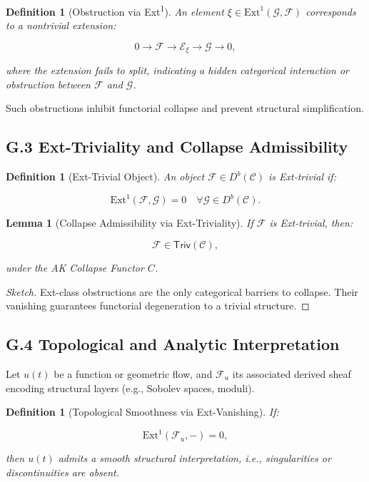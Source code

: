 \documentclass[11pt]{article}
\newtheorem{definition}[theorem]{Definition}
\newtheorem{lemma}[theorem]{Lemma}
\begin{document}
\begin{definition}[Obstruction via Ext\textsuperscript{1}]
An element \( \xi \in \mathrm{Ext}^1(\mathcal{G}, \mathcal{F}) \) corresponds to a nontrivial extension:

\[
0 \to \mathcal{F} \to \mathcal{E}_\xi \to \mathcal{G} \to 0,
\]

where the extension fails to split, indicating a hidden categorical interaction or obstruction between \( \mathcal{F} \) and \( \mathcal{G} \).
\end{definition}

Such obstructions inhibit functorial collapse and prevent structural simplification.

\subsection*{G.3 Ext-Triviality and Collapse Admissibility}

\begin{definition}[Ext-Trivial Object]
An object \( \mathcal{F} \in D^b(\mathcal{C}) \) is \emph{Ext-trivial} if:

\[
\mathrm{Ext}^1(\mathcal{F}, \mathcal{G}) = 0 \quad \forall \mathcal{G} \in D^b(\mathcal{C}).
\]
\end{definition}

\begin{lemma}[Collapse Admissibility via Ext-Triviality]
If \( \mathcal{F} \) is Ext-trivial, then:

\[
\mathcal{F} \in \mathsf{Triv}(\mathcal{C}),
\]

under the AK Collapse Functor \( C \).
\end{lemma}

\begin{proof}[Sketch]
Ext-class obstructions are the only categorical barriers to collapse. Their vanishing guarantees functorial degeneration to a trivial structure.
\end{proof}

\subsection*{G.4 Topological and Analytic Interpretation}

Let \( u(t) \) be a function or geometric flow, and \( \mathcal{F}_u \) its associated derived sheaf encoding structural layers (e.g., Sobolev spaces, moduli).

\begin{definition}[Topological Smoothness via Ext-Vanishing]
If:

\[
\mathrm{Ext}^1(\mathcal{F}_u, -) = 0,
\]

then \( u(t) \) admits a smooth structural interpretation, i.e., singularities or discontinuities are absent.
\end{definition}
\end{document}
